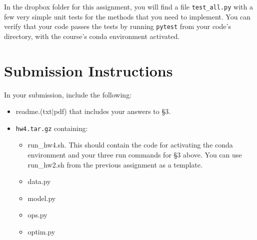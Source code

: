 \documentclass[11pt]{article}
\begin{document}
In the dropbox folder for this assignment, you will find a file \texttt{test\_all.py} with a few very simple unit tests for the methods that you need to implement.  You can verify that your code passes the tests by running \texttt{pytest} from your code's directory, with the course's conda environment activated.


\section*{Submission Instructions}

In your submission, include the following:
\begin{itemize}
  \item readme.(txt$\mid$pdf) that includes your answers to \S3. 
  \item \texttt{hw4.tar.gz} containing:
  \begin{itemize}
    \item run\_hw4.sh.  This should contain the code for activating the conda environment and your three run commands for \S3 above.  You can use run\_hw2.sh from the previous assignment as a template.
    \item data.py
    \item model.py
    \item ops.py
    \item optim.py
  \end{itemize}
\end{itemize}
\end{document}

